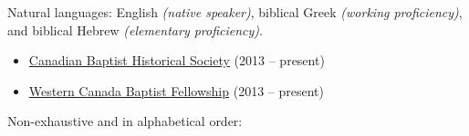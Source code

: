 \documentclass[10pt,letterpaper]{article} %
\begin{document}
\inlineheadsection %
{Natural languages:}
{English \textit{(native speaker)}, biblical Greek \textit{(working proficiency)}, and biblical Hebrew \textit{(elementary proficiency)}.}


\spacedhrule{1.6em}{-0.4em} %



\begin{itemize}
\item \href{https://www.facebook.com/canadianbaptisthistory}{Canadian Baptist Historical Society} (2013 -- present)
\item \href{http://wcbf.net/}{Western Canada Baptist Fellowship} (2013 -- present)
\end{itemize}



\spacedhrule{1.6em}{-0.4em} %



\inlineheadsection %
{Non-exhaustive and in alphabetical order:}
{

}

\end{document}
